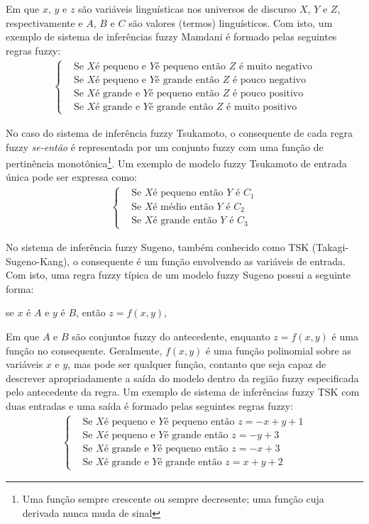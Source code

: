 Em que $x$, $y$ e $z$ são variáveis linguísticas nos universos de discurso $X$, $Y$ e $Z$, respectivamente e $A$, $B$ e $C$ são valores (termos) linguísticos. Com isto, um exemplo de sistema de inferências fuzzy Mamdani é formado pelas seguintes regras fuzzy:
\begin{align*}
\begin{cases}
&\mbox{Se }X  \mbox{é pequeno e } Y \mbox{é pequeno então } Z \mbox{ é muito negativo} \\
&\mbox{Se }X  \mbox{é pequeno e } Y \mbox{é grande então } Z \mbox{ é pouco negativo} \\
&\mbox{Se }X  \mbox{é grande e } Y \mbox{é pequeno então } Z \mbox{ é pouco positivo} \\
&\mbox{Se }X  \mbox{é grande e } Y \mbox{é grande então } Z \mbox{ é muito positivo} 
\end{cases}
\end{align*}

No caso do sistema de inferência fuzzy Tsukamoto, o consequente de cada regra fuzzy \textit{se-então} é representada por um conjunto fuzzy com uma função de pertinência monotônica\footnote{Uma função sempre crescente ou sempre decresente; uma função cuja derivada nunca muda de sinal}. Um exemplo de modelo fuzzy Tsukamoto de entrada única pode ser expressa como:
\begin{align*}
\begin{cases}
&\mbox{Se }X  \mbox{é pequeno então } Y \mbox{ é } C_1\\
&\mbox{Se }X  \mbox{é médio então } Y \mbox{ é } C_2\\
&\mbox{Se }X  \mbox{é grande então } Y \mbox{ é } C_3
\end{cases}
\end{align*}

No sistema de inferência fuzzy Sugeno, também conhecido como TSK (Takagi-Sugeno-Kang), o consequente é um função envolvendo as variáveis de entrada. Com isto, uma regra fuzzy típica de um modelo fuzzy Sugeno possui a seguinte forma:
\begin{center}
se $x$ é $A$ e $y$ é $B$, então $z = f(x,y)$,
\end{center}

Em que $A$ e $B$ são conjuntos fuzzy do antecedente, enquanto $z = f(x,y)$ é uma função no consequente. Geralmente, $f(x,y)$ é uma função polinomial sobre as variáveis $x$ e $y$, mas pode ser qualquer função, contanto que seja capaz de descrever apropriadamente a saída do modelo dentro da região fuzzy especificada pelo antecedente da regra. Um exemplo de sistema de inferências fuzzy TSK com duas entradas e uma saída é formado pelas seguintes regras fuzzy:
\begin{align*}
\begin{cases}
&\mbox{Se }X  \mbox{é pequeno e } Y \mbox{é pequeno então } z=-x+y+1 \\
&\mbox{Se }X  \mbox{é pequeno e } Y \mbox{é grande então } z=-y+3  \\
&\mbox{Se }X  \mbox{é grande e } Y \mbox{é pequeno então } z=-x+3  \\
&\mbox{Se }X  \mbox{é grande e } Y \mbox{é grande então } z=x+y+2  
\end{cases}
\end{align*}

